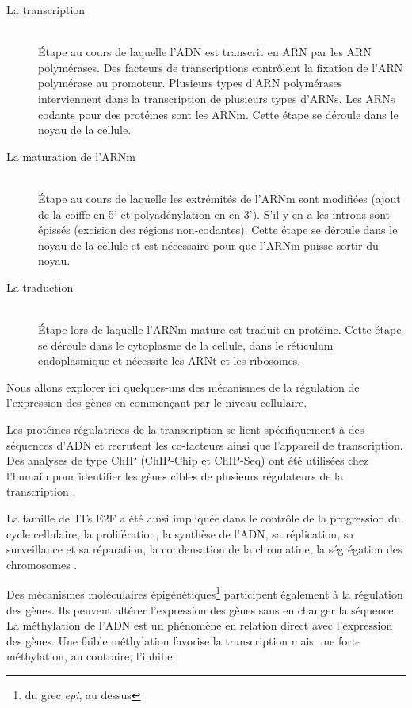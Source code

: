 			\begin{description}
					\item [La transcription]              \hfill \\
						Étape au cours de laquelle l'\acs{ADN} est transcrit en \acs{ARN} par les \acs{ARN} polymérases.
						Des facteurs de transcriptions contrôlent la fixation de l'\acs{ARN} polymérase au promoteur.
						Plusieurs types d'\acs{ARN} polymérases interviennent dans la transcription de plusieurs types d'\acsp{ARN}.
						Les \acsp{ARN} codants pour des protéines sont les \acs{ARNm}.
						Cette étape se déroule dans le noyau de la cellule.
					\item [La maturation de l'\acs{ARNm}] \hfill \\
						Étape au cours de laquelle les extrémités de l'\acs{ARNm} sont modifiées (ajout de la coiffe en 5' et polyadénylation en en 3').
						S'il y en a les introns sont épissés (excision des régions non-codantes).
						Cette étape se déroule dans le noyau de la cellule et est nécessaire pour que l'\acs{ARNm} puisse sortir du noyau.
			\pagebreak
					\item [La traduction]                 \hfill \\
						Étape lors de laquelle l'\acs{ARNm} mature est traduit en protéine.
						Cette étape se déroule dans le cytoplasme de la cellule, dans le réticulum endoplasmique et nécessite les \acs{ARNt} et les ribosomes.
			\end{description}

			Nous allons explorer ici quelques-uns des mécanismes de la régulation de l'expression des gènes en commençant par le niveau cellulaire.

			Les protéines régulatrices de la transcription se lient spécifiquement à des séquences d'\acs{ADN} et recrutent les co-facteurs ainsi que l'appareil de transcription.
			Des analyses de type \ac{ChIP} (\ac{ChIP-Chip} et \ac{ChIP-Seq}) ont été utilisées chez l'humain pour identifier les gènes cibles de plusieurs régulateurs de la transcription \citep{Ren2000, Park2009, NguyenDuc2013}.

			La famille de \acp{TF} \acs{E2F} a été ainsi impliquée dans le contrôle de la progression du cycle cellulaire, la prolifération, la synthèse de l'\acs{ADN}, sa réplication, sa surveillance et sa réparation, la condensation de la chromatine, la ségrégation des chromosomes \citep{Ren2002}.

			Des mécanismes moléculaires épigénétiques\footnote{du grec \emph{epi}, au dessus} participent également à la régulation des gènes.
			Ils peuvent altérer l'expression des gènes sans en changer la séquence.
			La méthylation de l'\acs{ADN} est un phénomène en relation direct avec l'expression des gènes.
			Une faible méthylation favorise la transcription mais une forte méthylation, au contraire, l'inhibe.

